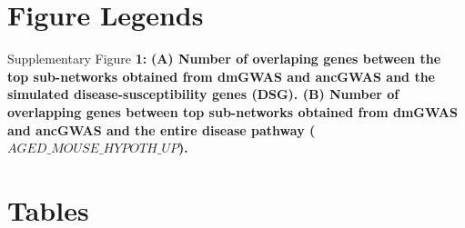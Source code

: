 \documentclass[10pt]{article}
\begin{document}



%


\newpage
\section*{Figure Legends} %


\begin{flushleft}
Supplementary Figure {\bf 1:} {\bf(A) Number of overlaping genes between the top sub-networks obtained from dmGWAS and ancGWAS and the simulated disease-susceptibility genes (DSG). (B) Number of overlapping genes between top sub-networks obtained from dmGWAS and ancGWAS and the entire disease pathway ($AGED\_MOUSE\_HYPOTH\_UP$).}
\end{flushleft}

\section*{Tables}
\end{document}
